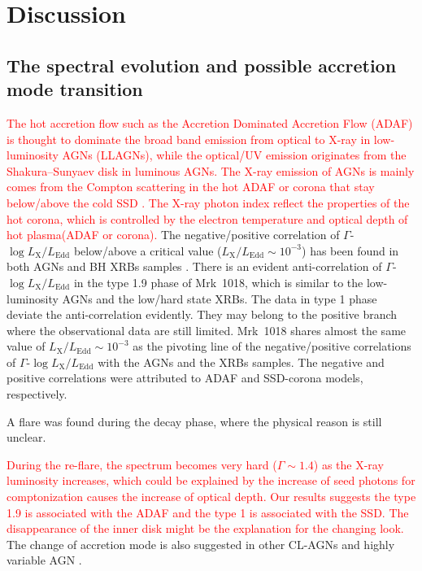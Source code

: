 \section{Discussion}\label{sec:discussion}
\subsection{The spectral evolution and possible accretion mode transition }
\label{sec:spectral evolution}
\textcolor{red}{The hot accretion flow such as the Accretion Dominated Accretion Flow (ADAF) is thought to dominate the broad band emission from optical to X-ray \citep[see reviews in ][]{2014ARA&A..52..529Y} in low-luminosity AGNs (LLAGNs), while the optical/UV emission originates from the Shakura–Sunyaev disk \citep[SSD; e.g. ][]{2013ApJ...764....2Q} in luminous AGNs. The X-ray emission of AGNs is mainly comes from the Compton scattering in the hot ADAF or corona that stay below/above the cold SSD \citep[e.g.][]{1991ApJ...380L..51H}. The X-ray photon index reflect the properties of the hot corona, which is controlled by the electron temperature and optical depth of hot plasma(ADAF or corona).} The negative/positive correlation of $\Gamma$-$\log{L_\mathrm{X}/L_\mathrm{Edd}}$ below/above a critical value ($L_\mathrm{X}/L_\mathrm{Edd} \sim 10^{-3}$) has been found in both AGNs and BH XRBs samples \citep[e.g.][]{2008ApJ...682..212W,2009MNRAS.399..349G,2011A&A...530A.149Y,2015MNRAS.447.1692Y}. There is an evident anti-correlation of $\Gamma$-$\log{L_\mathrm{X}/L_\mathrm{Edd}}$ in the type 1.9 phase of Mrk~1018, which is similar to the low-luminosity AGNs and the low/hard state XRBs. The data in type 1 phase deviate the anti-correlation evidently. They may belong to the positive branch where the observational data are still limited. Mrk~1018 shares almost the same value of $L_\mathrm{X}/L_\mathrm{Edd}\sim 10^{-3}$ as the pivoting line of the negative/positive correlations of $\Gamma$-$\log{L_\mathrm{X}/L_\mathrm{Edd}}$ with the AGNs and the XRBs samples. The negative and positive correlations were attributed to ADAF and SSD-corona models, respectively. 






A flare was found during the decay phase, where the physical reason is still unclear. 


\textcolor{red}{During the re-flare, the spectrum becomes very hard ($\Gamma \sim 1.4$) as the X-ray luminosity increases, which could be explained by the increase of seed photons for comptonization causes the increase of optical depth. Our results suggests the type 1.9 is associated with the ADAF and the type 1 is associated with the SSD. The disappearance of the inner disk might be the explanation for the changing look.} The change of accretion mode is also suggested in other CL-AGNs \citep{2020ApJ...890L..29A} and highly variable AGN \citep{2020MNRAS.492.2335L}.  

